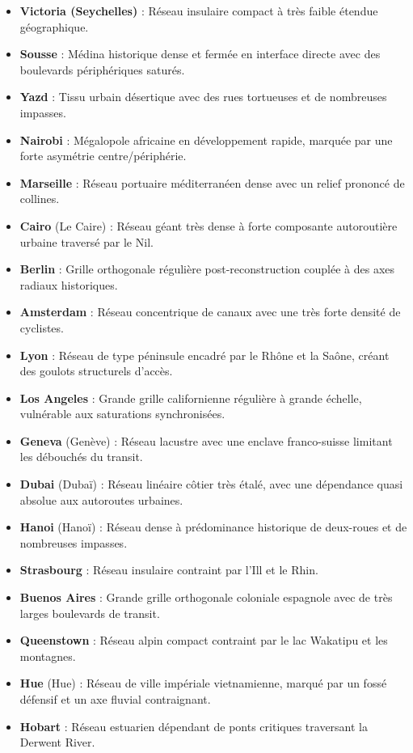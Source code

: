 \documentclass[10pt, a4paper]{article}
\begin{document}
\begin{itemize}
  \textbf{Valparaíso} : Réseau en amphithéâtre avec des pentes
  extrêmement fortes modifiant l'empreinte cinématique de charge.
\item
  \textbf{Victoria (Seychelles)} : Réseau insulaire compact à très
  faible étendue géographique.
\item
  \textbf{Sousse} : Médina historique dense et fermée en interface
  directe avec des boulevards périphériques saturés.
\item
  \textbf{Yazd} : Tissu urbain désertique avec des rues tortueuses et de
  nombreuses impasses.
\item
  \textbf{Nairobi} : Mégalopole africaine en développement rapide,
  marquée par une forte asymétrie centre/périphérie.
\item
  \textbf{Marseille} : Réseau portuaire méditerranéen dense avec un
  relief prononcé de collines.
\item
  \textbf{Cairo} (Le Caire) : Réseau géant très dense à forte composante
  autoroutière urbaine traversé par le Nil.
\item
  \textbf{Berlin} : Grille orthogonale régulière post-reconstruction
  couplée à des axes radiaux historiques.
\item
  \textbf{Amsterdam} : Réseau concentrique de canaux avec une très forte
  densité de cyclistes.
\item
  \textbf{Lyon} : Réseau de type péninsule encadré par le Rhône et la
  Saône, créant des goulots structurels d'accès.
\item
  \textbf{Los Angeles} : Grande grille californienne régulière à grande
  échelle, vulnérable aux saturations synchronisées.
\item
  \textbf{Geneva} (Genève) : Réseau lacustre avec une enclave
  franco-suisse limitant les débouchés du transit.
\item
  \textbf{Dubai} (Dubaï) : Réseau linéaire côtier très étalé, avec une
  dépendance quasi absolue aux autoroutes urbaines.
\item
  \textbf{Hanoi} (Hanoï) : Réseau dense à prédominance historique de
  deux-roues et de nombreuses impasses.
\item
  \textbf{Strasbourg} : Réseau insulaire contraint par l'Ill et le Rhin.
\item
  \textbf{Buenos Aires} : Grande grille orthogonale coloniale espagnole
  avec de très larges boulevards de transit.
\item
  \textbf{Queenstown} : Réseau alpin compact contraint par le lac
  Wakatipu et les montagnes.
\item
  \textbf{Hue} (Hue) : Réseau de ville impériale vietnamienne, marqué
  par un fossé défensif et un axe fluvial contraignant.
\item
  \textbf{Hobart} : Réseau estuarien dépendant de ponts critiques
  traversant la Derwent River.
\end{itemize}
\end{document}

